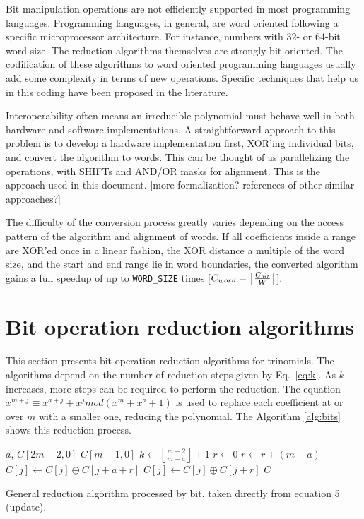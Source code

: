 Bit manipulation operations are not efficiently supported in most programming languages. Programming languages, in general, are word oriented following a specific microprocessor architecture. For instance, numbers with $32$- or $64$-bit word size. The reduction algorithms themselves are strongly bit oriented. The codification of these algorithms to word oriented programming languages usually add some complexity in terms of new operations. Specific techniques that help us in this coding have been proposed in the literature\cite{Hilewitz2008}. 

Interoperability often means an irreducible polynomial must behave well
in both hardware and software implementations. A straightforward
approach to this problem is to develop a hardware implementation first,
XOR'ing individual bits, and convert the algorithm to words. This can be
thought of as parallelizing the operations, with SHIFTs and AND/OR masks
for alignment. This is the approach used in this document. {[}more
formalization? references of other similar approaches?{]}

The difficulty of the conversion process greatly varies depending on the
access pattern of the algorithm and alignment of words. If all coefficients inside a range are
XOR'ed once in a linear fashion, the XOR distance a multiple of the word size, and the start and end range lie in word boundaries, the converted algorithm gains a full
speedup of up to \texttt{WORD\_SIZE} times
{[}$C_{word} = \ceil*{\frac{C_{bit}}{W}}${]}.

\section{Bit operation reduction algorithms}\label{sec:bit:operation}
This section presents bit operation reduction algorithms for trinomials. The algorithms depend on the number of reduction steps given by Eq.~\ref{eq:k}. As $k$ increases, more steps can be required to perform the reduction. The equation $x^{m+j} \equiv x^{a+j} + x^j mod (x^m+x^a+1)$ is used to replace each coefficient at or over $m$ with a smaller one, reducing the polynomial. The Algorithm \ref{alg:bits} shows this reduction process. 

\begin{algorithm}
\begin{algorithmic}[1]
  \REQUIRE $a$, $C[2m-2,0]$
  \ENSURE $C[m-1,0]$
  \STATE $k \gets \left \lfloor \frac{m-2}{m-a} \right \rfloor + 1$
  \STATE $r \gets 0$
    \STATE $r \gets r + (m-a)$
      \STATE $C[j] \gets C[j] \oplus C[j+a+r]$
      \ENDFOR
      \STATE $C[j] \gets C[j] \oplus C[j+r]$
      \ENDFOR
    \ENDFOR
  \RETURN $C$
  \caption{General reduction algorithm processed by bit, taken directly from equation 5 (update).}
  \label{alg:bits}
\end{algorithmic}
\end{algorithm}

